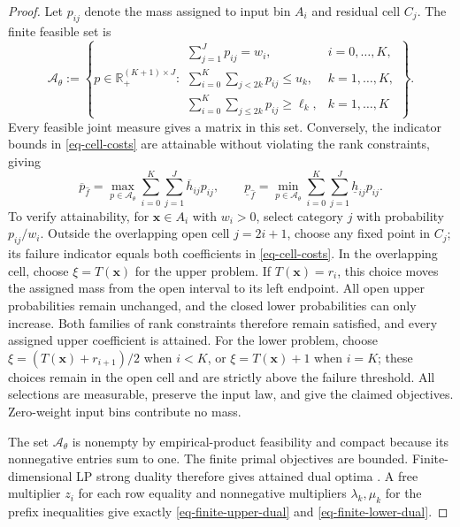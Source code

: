 \begin{proof}
  Let $p_{ij}$ denote the mass assigned to input bin $A_i$ and residual cell $C_j$. The finite feasible set is
  \begin{equation}
    \mathcal A_\theta:=\left\{p\in\mathbb R_+^{(K+1)\times J}:
    \begin{array}{ll}
      \displaystyle\sum_{j=1}^Jp_{ij}=w_i,&i=0,\ldots,K,\\[1mm]
      \displaystyle\sum_{i=0}^K\sum_{j<2k}p_{ij}\le u_k,&k=1,\ldots,K,\\[1mm]
      \displaystyle\sum_{i=0}^K\sum_{j\le2k}p_{ij}\ge\ell_k,&k=1,\ldots,K
    \end{array}\right\}.
    \label{eq-cell-mass-polytope}
  \end{equation}
  Every feasible joint measure gives a matrix in this set. Conversely, the indicator bounds in \eqref{eq-cell-costs} are attainable without violating the rank constraints, giving
  \begin{equation}
    \overline p_{\hat f}=\max_{p\in\mathcal A_\theta}\sum_{i=0}^K\sum_{j=1}^J\overline h_{ij}p_{ij},\qquad
    \underline p_{\hat f}=\min_{p\in\mathcal A_\theta}\sum_{i=0}^K\sum_{j=1}^J\underline h_{ij}p_{ij}.
    \label{eq-finite-primal-values}
  \end{equation}
  To verify attainability, for $\bm x\in A_i$ with $w_i>0$, select category $j$ with probability $p_{ij}/w_i$. Outside the overlapping open cell $j=2i+1$, choose any fixed point in $C_j$; its failure indicator equals both coefficients in \eqref{eq-cell-costs}. In the overlapping cell, choose $\xi=T(\bm x)$ for the upper problem. If $T(\bm x)=r_i$, this choice moves the assigned mass from the open interval to its left endpoint. All open upper probabilities remain unchanged, and the closed lower probabilities can only increase. Both families of rank constraints therefore remain satisfied, and every assigned upper coefficient is attained. For the lower problem, choose $\xi=(T(\bm x)+r_{i+1})/2$ when $i<K$, or $\xi=T(\bm x)+1$ when $i=K$; these choices remain in the open cell and are strictly above the failure threshold. All selections are measurable, preserve the input law, and give the claimed objectives. Zero-weight input bins contribute no mass.

  The set $\mathcal A_\theta$ is nonempty by empirical-product feasibility and compact because its nonnegative entries sum to one. The finite primal objectives are bounded. Finite-dimensional LP strong duality therefore gives attained dual optima \citep[Section~5.2.3]{B.V04}. A free multiplier $z_i$ for each row equality and nonnegative multipliers $\lambda_k,\mu_k$ for the prefix inequalities give exactly \eqref{eq-finite-upper-dual} and \eqref{eq-finite-lower-dual}.


\end{proof}
